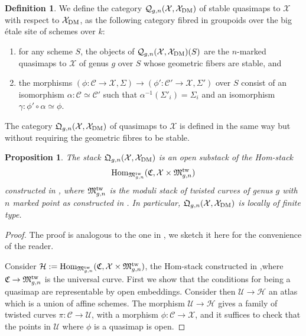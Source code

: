 \documentclass{amsart}
\newcommand{\sC}{\mathscr{C}}
\newcommand{\cH}{\mathcal{H}}
\newcommand{\cQ}{\mathcal{Q}}
\newcommand{\cU}{\mathcal{U}}
\newcommand{\cX}{\mathcal{X}}
\newcommand{\dm}{{\rm DM}}
\newtheorem{Prop}[theorem]{Proposition}
\theoremstyle{definition}
\newtheorem{Def}[theorem]{Definition}
\theoremstyle{definition}
\begin{document}
{\begin{Def}
We define the category $\cQ_{g,n}(\cX,\cX_\dm)$ of stable quasimaps to $\cX$ with respect to $\cX_\dm$, as the following category fibred in groupoids over the big \'{e}tale site of schemes over $k$:
\begin{enumerate}
    \item for any scheme $S$, the objects of $\cQ_{g,n}(\cX,\cX_\dm)(S)$ are the $n$-marked quasimaps to $\cX$ of genus $g$ over $S$ whose geometric fibers are stable, and
    \item the morphisms $(\phi\colon\sC\to\cX,\Sigma) \longrightarrow (\phi'\colon\sC'\to\cX,\Sigma')$ over $S$ consist of an isomorphism $\alpha\colon\sC\simeq \sC'$ such that $\alpha^{-1}(\Sigma'_i)=\Sigma_i$ and an isomorphism $\gamma\colon\phi'\circ\alpha \simeq \phi$.
\end{enumerate}
The category $\mathfrak{Q}_{g,n}(\cX,\cX_\dm)$ of quasimaps to $\cX$ is defined in the same way but without requiring the geometric fibres to be stable.
\end{Def}
\begin{Prop}\label{prop_qmap_gives_open_cond}
    The stack $\mathfrak{Q}_{g,n}(\cX,\cX_\dm)$ is an open substack of the Hom-stack 
    \[\operatorname{Hom}_{\mathfrak{M}_{g,n}^{\rm tw}}(\mathfrak{C}, \cX\times \mathfrak{M}_{g,n}^{\rm tw})
    \]
    constructed in \cite{hall2019coherent},
    where $\mathfrak{M}_{g,n}^{\rm tw}$ is the moduli stack of twisted curves of genus $g$ with $n$ marked point as constructed in \cite{olsson2007log}. In particular, $\mathfrak{Q}_{g,n}(\cX,\cX_\dm)$ is locally of finite type.
\end{Prop}
\begin{proof}

The proof is analogous to the one in \cite{orbifold_qmap_theory}, we sketch it here for the convenience of the reader. 
    
    Consider $\cH:=\operatorname{Hom}_{\mathfrak{M}_{g,n}^{\rm tw}}(\mathfrak{C}, \cX\times \mathfrak{M}_{g,n}^{\rm tw})$, the Hom-stack constructed in \cite{hall2019coherent},where $\mathfrak{C}\to \mathfrak{M}_{g,n}^{\rm tw}$ is the universal curve. First we show that the conditions for being a quasimap are representable by open embeddings. Consider then $\cU\to \cH$ an atlas which is a union of affine schemes.
    The morphism $\cU\to \cH$ gives a family of twisted curves $\pi:\sC\to \cU$, with a morphism $\phi:\sC\to \cX$, and it suffices to check that the points in $\cU$ where $\phi$ is a quasimap is open. 
    

\end{proof}}
\end{document}
